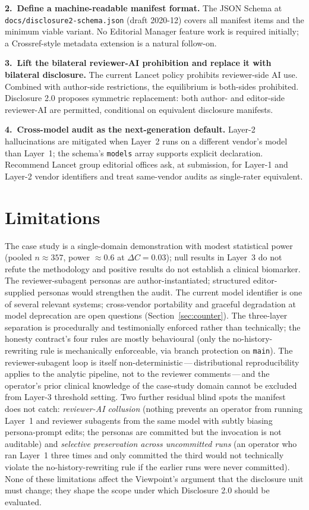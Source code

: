 \documentclass[11pt,a4paper]{article}
\begin{document}
\textbf{2.~Define a machine-readable manifest format.} The JSON Schema at \texttt{docs/disclosure2-schema.json} (draft 2020-12) covers all manifest items and the minimum viable variant. No Editorial Manager feature work is required initially; a Crossref-style metadata extension is a natural follow-on.

\textbf{3.~Lift the bilateral reviewer-AI prohibition and replace it with bilateral disclosure.} The current Lancet policy prohibits reviewer-side AI use\citep{lancetaipolicy2024}. Combined with author-side restrictions, the equilibrium is both-sides prohibited. Disclosure 2.0 proposes symmetric replacement: both author- and editor-side reviewer-AI are permitted, conditional on equivalent disclosure manifests.

\textbf{4.~Cross-model audit as the next-generation default.} Layer-2 hallucinations are mitigated when Layer~2 runs on a different vendor's model than Layer~1; the schema's \texttt{models} array supports explicit declaration. Recommend Lancet group editorial offices ask, at submission, for Layer-1 and Layer-2 vendor identifiers and treat same-vendor audits as single-rater equivalent.

\section{Limitations}\label{sec:limits}

The case study is a single-domain demonstration with modest statistical power (pooled $n \approx 357$, power $\approx 0.6$ at $\Delta C = 0.03$); null results in Layer~3 do not refute the methodology and positive results do not establish a clinical biomarker. The reviewer-subagent personas are author-instantiated; structured editor-supplied personas would strengthen the audit. The current model identifier is one of several relevant systems; cross-vendor portability and graceful degradation at model deprecation are open questions (Section~\ref{sec:counter}). The three-layer separation is procedurally and testimonially enforced rather than technically; the honesty contract's four rules are mostly behavioural (only the no-history-rewriting rule is mechanically enforceable, via branch protection on \texttt{main}). The reviewer-subagent loop is itself non-deterministic\,---\,distributional reproducibility applies to the analytic pipeline, not to the reviewer comments\,---\,and the operator's prior clinical knowledge of the case-study domain cannot be excluded from Layer-3 threshold setting. Two further residual blind spots the manifest does not catch: \emph{reviewer-AI collusion} (nothing prevents an operator from running Layer~1 and reviewer subagents from the same model with subtly biasing persona-prompt edits; the personas are committed but the invocation is not auditable) and \emph{selective preservation across uncommitted runs} (an operator who ran Layer~1 three times and only committed the third would not technically violate the no-history-rewriting rule if the earlier runs were never committed). None of these limitations affect the Viewpoint's argument that the disclosure unit must change; they shape the scope under which Disclosure 2.0 should be evaluated.
\end{document}

